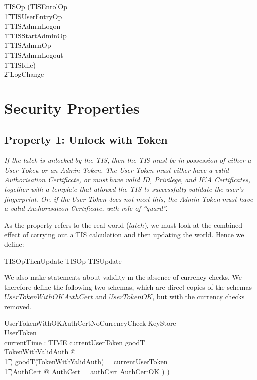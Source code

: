 \begin{zed}
	TISOp  (TISEnrolOp
\\ \t1			\lor TISUserEntryOp
\\ \t1			\lor TISAdminLogon
\\ \t1			\lor TISStartAdminOp
\\ \t1			\lor TISAdminOp
\\ \t1			\lor TISAdminLogout
\\ \t1			\lor TISIdle) 
\\ \t2				\land LogChange
\end{zed}
\section{Security Properties}
\label{sec:SecProp}
\subsection{Property 1: Unlock with Token}
\label{sec:UnlockProp}
{\em If the latch is unlocked by the TIS,
then the TIS must be in possession of either a User Token or an Admin Token.
The User Token must either have a valid Authorisation Certificate,
or must have valid ID, Privilege, and I\&A Certificates,
together with
a template that allowed the TIS to successfully validate the user's fingerprint.
Or, if the User Token does not meet this,
the Admin Token must have a valid Authorisation Certificate,
with role of ``guard''.
}

As the property refers to the real world ($latch$),
we must look at the combined effect of carrying out a TIS calculation
and then updating the world.
Hence we define:

\begin{zed}
	TISOpThenUpdate  TISOp \semi TISUpdate
\end{zed}

We also make statements about validity in the absence of currency checks.
We therefore define the following two schemas,
which are direct copies of the schemas
$UserTokenWithOKAuthCert$ and
$UserTokenOK$,
but with the currency checks removed.

\begin{schema}{UserTokenWithOKAuthCertNoCurrencyCheck}
        KeyStore
\\      UserToken
\\      currentTime : TIME
\where
        currentUserToken \in \ran goodT
\\	\exists TokenWithValidAuth @ 
\\ \t1		(
		goodT(\theta TokenWithValidAuth) = currentUserToken
\\ \t1          \land (\exists AuthCert @ \theta AuthCert = \The
authCert \land AuthCertOK )  
		)
\end{schema}


